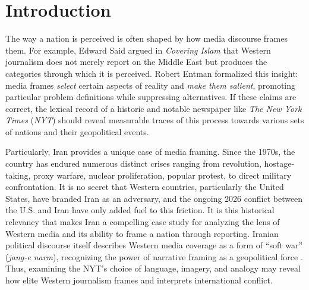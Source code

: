 \documentclass{dhnbpub}
\begin{document}
\section{Introduction}
The way a nation is perceived is often shaped by how media discourse frames them. For example, Edward Said argued in \emph{Covering Islam} \citep{Said1981} that Western journalism does not merely report on the Middle East but produces the categories through which it is perceived. Robert Entman \citep{Entman1993} formalized this insight: media frames \emph{select} certain aspects of reality and \emph{make them salient}, promoting particular problem definitions while suppressing alternatives. If these claims are correct, the lexical record of a historic and notable newspaper like \textit{The New York Times} (\textit{NYT}) should reveal measurable traces of this process towards various sets of nations and their geopolitical events. 

Particularly, Iran provides a unique case of media framing. Since the 1970s, the country has endured numerous distinct crises ranging from revolution, hostage-taking, proxy warfare, nuclear proliferation, popular protest, to direct military confrontation. It is no secret that Western countries, particularly the United States, have branded Iran as an adversary, and the ongoing 2026 conflict between the U.S. and Iran have only added fuel to this friction. It is this historical relevancy that makes Iran a compelling case study for analyzing the lens of Western media and its ability to frame a nation through reporting. Iranian political discourse itself describes Western media coverage as a form of ``soft war'' (\emph{jang-e narm}), recognizing the power of narrative framing as a geopolitical force \citep{Blout2017}. Thus, examining the NYT’s choice of language, imagery, and analogy may reveal how elite Western journalism frames and interprets international conflict.
\end{document}
